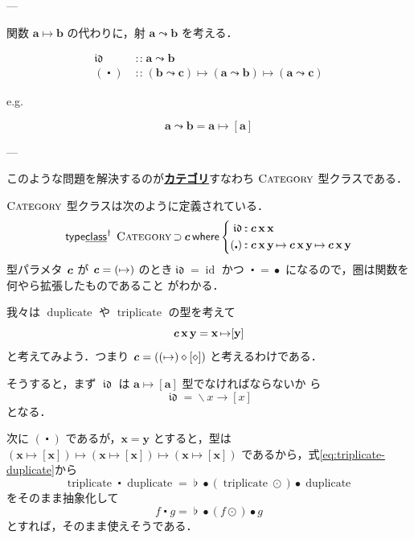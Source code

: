\documentclass[a5paper,twoside,fleqn,draft]{jsbook}
\newcommand{\keyword}[1]{{\underline{\textbf{#1}}}}
\newcommand{\mKeyword}[1]{\mathsf{#1}}
\newcommand{\mKeywordUnderline}[1]{\text{\underline{\textsf{#1}}}}
\newcommand{\mTypeClassDeclKeyword}{\mKeyword{type}\mKeywordUnderline{class}}
\newcommand{\mWhereKeyword}{\mKeyword{where}}
\DeclareMathOperator{\mSuperSet}{\supset}
\DeclareMathOperator{\mTypeClassDeclPolymorphic}{\mTypeClassDeclKeyword^\dagger}
\DeclareMathOperator{\mWhere}{\mWhereKeyword}
\newcommand{\mAnonParam}{\diamond}
\newcommand{\mSpecialFunc}[1]{#1}
\newcommand{\mVarSpecialFunc}[1]{\mathfrak{#1}}
\DeclareMathOperator{\mDuplicate}{\mSpecialFunc{duplicate}}
\DeclareMathOperator{\mId}{\mSpecialFunc{id}}
\DeclareMathOperator{\mIdCat}{\mVarSpecialFunc{id}}
\DeclareMathOperator{\mTriplicate}{\mSpecialFunc{triplicate}}
\DeclareMathOperator{\mComp}{\bullet}
\DeclareMathOperator{\mCompCat}{\centerdot}
\DeclareMathOperator{\mIn}{{:\!:}}
\DeclareMathOperator{\mJoinList}{\flat} %
\DeclareMathOperator{\mLambda}{\backslash}
\DeclareMathOperator{\mLambdaArrow}{\rightarrow}
\DeclareMathOperator{\mMapList}{\odot}
\DeclareMathOperator{\mMapsTo}{\mapsto}
\newcommand{\mType}[1]{\mathbf{#1}} %
\newcommand{\mPolymorphicTypeParameter}[1]{\textbf{\textit{#1}}}
\newcommand{\mA}{\mType{a}}
\newcommand{\mB}{\mType{b}}
\newcommand{\mC}{\mType{c}}
\newcommand{\mX}{\mType{x}}
\newcommand{\mY}{\mType{y}}
\newcommand{\mTypeClass}[1]{\textsc{#1}} %
\newcommand{\mCategoryTypeClass}{\mTypeClass{Category}}
\begin{document}
---

関数 $\mA\mMapsTo\mB$ の代わりに，射 $\mA\leadsto\mB$ を考える．

\begin{align}
  \mIdCat
  &\mIn{}\mA\leadsto\mB\\
  (\mCompCat)
  &\mIn{}(\mB\leadsto\mC)
  \mMapsTo(\mA\leadsto\mB)
  \mMapsTo(\mA\leadsto\mC)
\end{align}

e.g.

\begin{equation}
  \mA\leadsto\mB
  =\mA\mMapsTo[\mA]
\end{equation}

---


このような問題を解決するのが\keyword{カテゴリ}すなわち
$\mCategoryTypeClass$ 型クラスである．

$\mCategoryTypeClass$ 型クラスは次のように定義されている．
\begin{equation}
  \mTypeClassDeclPolymorphic\;
  \mCategoryTypeClass\mSuperSet\mPolymorphicTypeParameter{c}
  \mWhere\left\{
  \begin{aligned}
    \mIdCat&\mIn\mPolymorphicTypeParameter{c}\,\mX\,\mX\\
    (\mCompCat)
    &\mIn\mPolymorphicTypeParameter{c}\,\mX\,\mY
    \mMapsTo\mPolymorphicTypeParameter{c}\,\mX\,\mY
    \mMapsTo\mPolymorphicTypeParameter{c}\,\mX\,\mY
  \end{aligned}
  \right.
\end{equation}
型パラメタ $\mPolymorphicTypeParameter{c}$ が
$\mPolymorphicTypeParameter{c}=(\mMapsTo)$ のとき$\mIdCat=\mId$ かつ
$\mCompCat=\mComp$ になるので，圏は関数を何やら拡張したものであること
がわかる．

我々は $\mDuplicate$ や $\mTriplicate$ の型を考えて
\begin{equation}
  \mPolymorphicTypeParameter{c}\,\mX\,\mY
  =\mX\mMapsTo[\mY]
\end{equation}
と考えてみよう．つまり
$\mPolymorphicTypeParameter{c}=((\mMapsTo)\mAnonParam[\mAnonParam])$
と考えるわけである．

そうすると，まず $\mIdCat$ は $\mA\mMapsTo[\mA]$ 型でなければならないか
ら
\begin{equation}
  \label{eq:id-category}
  \mIdCat
  =\mLambda x\mLambdaArrow[x]
\end{equation}
となる．

次に $(\mCompCat)$ であるが，$\mX=\mY$ とすると，型は
$(\mX\mMapsTo[\mX])\mMapsTo(\mX\mMapsTo[\mX])\mMapsTo(\mX\mMapsTo[\mX])$
であるから，式\eqref{eq:triplicate-duplicate}から
\begin{equation}
  \mTriplicate\mCompCat\mDuplicate
  =\mJoinList\mComp(\mTriplicate\mMapList)\mComp\mDuplicate
\end{equation}
をそのまま抽象化して
\begin{equation}
  \label{eq:triplicate-duplicate-comp}
  f\mCompCat g=\mJoinList\mComp(f\mMapList)\mComp g
\end{equation}
とすれば，そのまま使えそうである．
\end{document}
